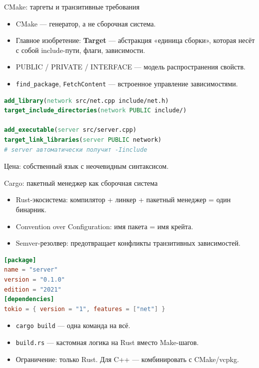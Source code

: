 \documentclass{beamer}
\begin{document}
\begin{frame}[fragile]{CMake: таргеты и транзитивные требования}
\begin{itemize}
\item CMake — генератор, а не сборочная система.
\item Главное изобретение: \textbf{Target} — абстракция «единица сборки»,
которая несёт с собой include-пути, флаги, зависимости.
\item PUBLIC / PRIVATE / INTERFACE — модель распространения свойств.
\item \texttt{find\_package}, \texttt{FetchContent} — встроенное управление
зависимостями.
\end{itemize}
\begin{lstlisting}[language=CMake]
add_library(network src/net.cpp include/net.h)
target_include_directories(network PUBLIC include/)

add_executable(server src/server.cpp)
target_link_libraries(server PUBLIC network)
# server автоматически получит -Iinclude
\end{lstlisting}
Цена: собственный язык с неочевидным синтаксисом.
\end{frame}

\begin{frame}[fragile]{Cargo: пакетный менеджер как сборочная система}
\begin{itemize}
\item Rust-экосистема: компилятор + линкер + пакетный менеджер = один бинарник.
\item Convention over Configuration: имя пакета = имя крейта.
\item Semver-резолвер: предотвращает конфликты транзитивных зависимостей.
\end{itemize}
\begin{lstlisting}[language=TOML,numbers=none]
[package]
name = "server"
version = "0.1.0"
edition = "2021"
[dependencies]
tokio = { version = "1", features = ["net"] }
\end{lstlisting}
\begin{itemize}
\item \texttt{cargo build} — одна команда на всё.
\item \texttt{build.rs} — кастомная логика на Rust вместо Make-шагов.
\item Ограничение: только Rust. Для C++ — комбинировать с CMake/vcpkg.
\end{itemize}
\end{frame}
\end{document}
